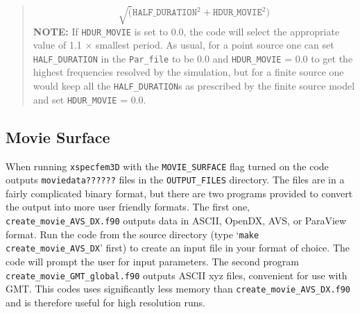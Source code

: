 \documentclass[oneside,english]{book}
\begin{document}
\begin{quote}
\[
\sqrt{(}\mathrm{\mathtt{HALF\_DURATIO}\mathtt{N}^{2}}+\mathrm{\mathtt{HDUR\_MOVI}\mathtt{E}^{2}})\]
\textbf{NOTE:} If \texttt{HDUR\_MOVIE} is set to 0.0, the code will
select the appropriate value of 1.1 $\times$ smallest period. As
usual, for a point source one can set \texttt{HALF\_DURATION} in the
\texttt{Par\_file} to be 0.0 and \texttt{HDUR\_MOVIE} = 0.0 to get
the highest frequencies resolved by the simulation, but for a finite
source one would keep all the \texttt{HALF\_DURATION}s as prescribed
by the finite source model and set \texttt{HDUR\_MOVIE} = 0.0.
\end{quote}

\subsection{Movie Surface}

When running \texttt{xspecfem3D} with the \texttt{MOVIE\_SURFACE}
flag turned on the code outputs \texttt{moviedata??????} files in
the \texttt{OUTPUT\_FILES} directory. The files are in a fairly complicated
binary format, but there are two programs provided to convert the
output into more user friendly formats. The first one, \texttt{create\_movie\_AVS\_DX.f90}
outputs data in ASCII, OpenDX, AVS, or ParaView format. Run the code
from the source directory (type `\texttt{make} \texttt{create\_movie\_AVS\_DX}'
first) to create an input file in your format of choice. The code
will prompt the user for input parameters. The second program \texttt{create\_movie\_GMT\_global.f90}
outputs ASCII xyz files, convenient for use with GMT. This codes uses
significantly less memory than \texttt{create\_movie\_AVS\_DX.f90}
and is therefore useful for high resolution runs.
\end{document}
